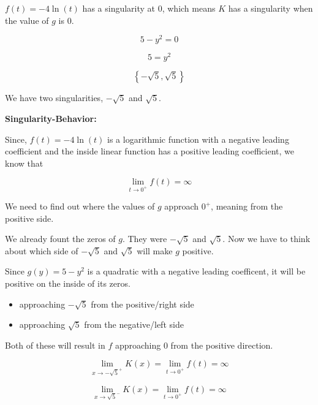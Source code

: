 \documentclass{ximera}
\begin{document}
$f(t) = -4\ln(t)$ has a singularity at $0$, which means $K$ has a singularity when the value of $g$ is $0$.



\[
5 - y^2 = 0
\]



\[
5 = y^2
\]



\[
\left\{ -\sqrt{5}, \sqrt{5} \right\}
\]

We have two singularities, $-\sqrt{5}$ and $\sqrt{5}$. 












\textbf{\textcolor{blue!55!black}{Singularity-Behavior:}} 



Since, $f(t) = -4 \ln(t)$ is a logarithmic function with a negative leading coefficient and the inside linear function has a positive leading coefficient, we know that 


\[
\lim\limits_{t \to 0^+} f(t) = \infty
\]



We need to find out where the values of $g$ approach $0^+$, meaning from the positive side. 


We already fount the zeros of $g$.  They were $-\sqrt{5}$ and $\sqrt{5}$.  Now we have to think about which side of $-\sqrt{5}$ and $\sqrt{5}$ will make $g$ positive. 


Since $g(y) = 5 - y^2$ is a quadratic with a negative leading coefficent, it will be positive on the inside of its zeros. 

\begin{itemize}
\item approaching $-\sqrt{5}$ from the positive/right side
\item approaching $\sqrt{5}$ from the negative/left side
\end{itemize}

Both of these will result in $f$ approaching $0$ from the positive direction. 



\[
\lim\limits_{x \to -\sqrt{5}^+} K(x)  = \lim\limits_{t \to 0^+} f(t) = \infty
\]



\[
\lim\limits_{x \to \sqrt{5}^-} K(x)  = \lim\limits_{t \to 0^+} f(t) = \infty
\]
\end{document}
